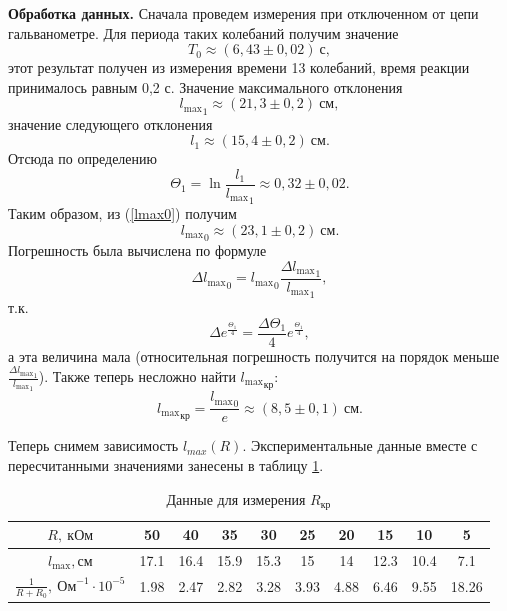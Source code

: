 \documentclass[12pt,a4paper]{article}
\begin{document}
\textbf{Обработка данных.} Сначала проведем измерения при отключенном от цепи гальванометре. Для периода таких колебаний получим значение
\begin{equation}
T_0 \approx (6,43 \pm 0,02)~\text{с},
\end{equation}
этот результат получен из измерения времени 13 колебаний, время реакции принималось равным 0,2 с. Значение максимального отклонения 
\begin{equation}
{l_\text{max}}_1 \approx (21,3\pm0,2)~\text{см},
\end{equation}
значение следующего отклонения
\begin{equation} 
l_1 \approx (15,4\pm0,2)~\text{см}.
\end{equation}
Отсюда по определению
\begin{equation}
\Theta_1 = \ln\frac{l_1}{{l_\text{max}}_1} \approx 0,32\pm0,02.
\end{equation}
Таким образом, из (\ref{lmax0}) получим
\begin{equation}
{l_\text{max}}_0 \approx (23,1\pm0,2)~\text{см}.\label{lmax0val}
\end{equation}
Погрешность была вычислена по формуле
\begin{equation}
\Delta {l_\text{max}}_0 = {l_\text{max}}_0\frac{\Delta {l_\text{max}}_1}{{l_\text{max}}_1},
\end{equation}
т.к.
\begin{equation}
\Delta e^{\frac{\Theta_1}{4}} = \frac{\Delta\Theta_1}{4}e^{\frac{\Theta_1}{4}},
\end{equation}
а эта величина мала (относительная погрешность получится на порядок меньше $\frac{\Delta {l_\text{max}}_1}{{l_\text{max}}_1}$). Также теперь несложно найти ${l_\text{max}}_\text{кр}$:
\begin{equation}
{l_\text{max}}_\text{кр} = \frac{{l_\text{max}}_0}{e} \approx (8,5\pm0,1)~\text{см}. 
\end{equation}

Теперь снимем зависимость $l_{max}(R)$. Экспериментальные данные вместе с пересчитанными значениями занесены в таблицу \ref{tab3}.
\begin{table}[ht]\centering
\begin{tabular}{|*{10}{c|}}
\hline
$R,~\text{кОм}$&50&40&35&30&25&20&15&10&5\\
\hline
$l_\text{max},\text{см}$&17.1&16.4&15.9&15.3&15&14&12.3&10.4&7.1\\
\hline
$\frac{1}{R + R_0},~\text{Ом}^{-1}\cdot10^{-5}$&1.98&2.47&2.82&3.28&3.93&4.88&6.46&9.55&18.26\\
\hline
\end{tabular}
\caption{Данные для измерения $R_\text{кр}$ \label{tab3}}
\end{table}
\end{document}

